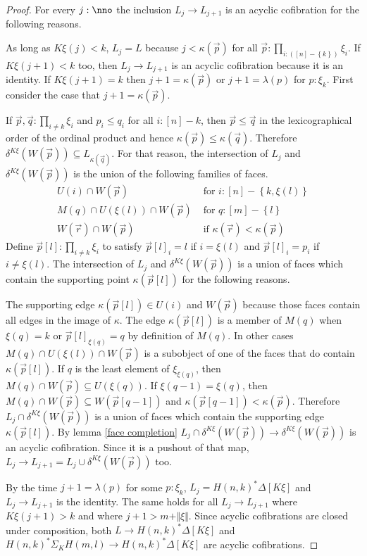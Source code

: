 \documentclass{tac}
\newcommand\set[1]{\left\{#1\right\}}
\newcommand\ri{^*}
\newcommand\of{:}
\newcommand\simplex\Delta
\newcommand\norm[1]{\Vert #1 \Vert}
\newcommand\ka\kappa
\newcommand\la\lambda
\newcommand\depsum{\Sigma_}
\newcommand\face\delta
\newcommand\U{U}
\newcommand\A{M}
\newcommand\W{W}
\begin{document}
\begin{proof}
For every $j\of\nno$ the inclusion $L_j\to L_{j+1}$ is an acyclic cofibration for the following reasons.

As long as $K\xi(j)<k$, $L_j = L$ because $j<\kappa(\vec p)$ for all $\vec p \of\prod_{i\of([n]-\set k)}\xi_i$. If $K\xi(j+1)<k$ too, then $L_j\to L_{j+1}$ is an acyclic cofibration because it is an identity. If $K\xi(j+1) = k$ then $j+1=\kappa(\vec p)$ or $j+1 = \la(p)$ for $p\of\xi_k$. First consider the case that $j+1=\ka(\vec p)$. 

If $\vec p,\vec q\of\prod_{i\neq k} \xi_i$ and $p_i\leq q_i$ for all $i\of[n]-k$, then $\vec p \leq \vec q$ in the lexicographical order of the ordinal product and hence $\ka(\vec p)\leq \ka(\vec q)$. Therefore $\face^{K\xi}(\W(\vec p))\subseteq L_{\ka(\vec q)}$. For that reason, the intersection of $L_j$ and $\face^{K\xi}(\W(\vec p))$ is the union of the following families of faces.
\begin{align*}
\U(i)\cap \W(\vec p) &\textrm{ for $i\of[n]-\set{k,\xi(l)}$}\\
\A(q)\cap\U(\xi(l))\cap \W(\vec p) &\textrm{ for $q\of[m]-\set l$}\\
\W(\vec r)\cap \W(\vec p) &\textrm{ if $\kappa(\vec r)<\kappa(\vec p)$ }
\end{align*}
Define $\vec p[l]\of\prod_{i\neq k} \xi_i$ to satisfy $\vec p[l]_i = l$ if $i=\xi(l)$ and $\vec p[l]_i = p_i$ if $i\neq \xi(l)$. The intersection of $L_j$ and $\face^{K\xi}(\W(\vec p))$ is a union of faces which contain the supporting point $\kappa(\vec p[l])$ for the following reasons. 

The supporting edge $\kappa(\vec p[l])\in\U(i)$ and $\W(\vec p)$ because those faces contain all edges in the image of $\ka$. The edge $\kappa(\vec p[l])$ is a member of $\A(q)$ when $\xi(q)=k$ or $\vec p[l]_{\xi(q)}=q$ by definition of $M(q)$. In other cases $\A(q)\cap\U(\xi(l))\cap \W(\vec p)$ is a subobject of one of the faces that do contain $\kappa(\vec p[l])$. If $q$ is the least element of $\xi_{\xi(q)}$, then $\A(q)\cap\W(\vec p)\subseteq \U(\xi(q))$. If $\xi(q-1)=\xi(q)$, then $\A(q)\cap \W(\vec p) \subseteq \W(\vec p[q-1])$ and $\kappa(\vec p[q-1])<\kappa(\vec p)$. Therefore $L_j\cap \face^{K\xi}(\W(\vec p))$ is a union of faces which contain the supporting edge $\ka(\vec p[l])$. By lemma \ref{face completion} $L_j\cap \face^{K\xi}(\W(\vec p))\to \face^{K\xi}(\W(\vec p))$ is an acyclic cofibration. Since it is a pushout of that map, $L_j\to L_{j+1} = L_j\cup \face^{K\xi}(\W(\vec p))$ too.

By the time $j+1 = \la(p)$ for some $p\of \xi_k$, $L_j = H(n,k)\ri \simplex[K\xi]$ and $L_j\to L_{j+1}$ is the identity. The same holds for all $L_j\to L_{j+1}$ where $K\xi(j+1)>k$ and where $j+1>m+\norm\xi$. Since acyclic cofibrations are closed under composition, both $L\to H(n,k)\ri \simplex[K\xi]$ and $H(n,k)\ri \depsum K H(m,l) \to H(n,k)\ri \simplex[K\xi]$ are acyclic cofibrations.
\end{proof}
\end{document}
